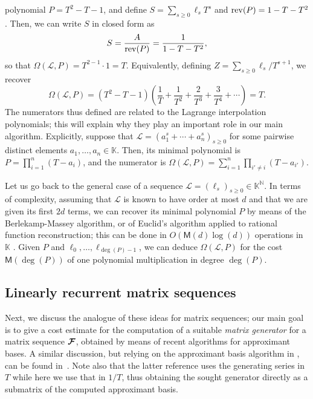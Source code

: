 \documentclass[12pt]{article}
\newcommand{\var}{T} %
\newcommand{\mat}[1]{\bm{\MakeUppercase{#1}}} %
\newcommand{\seq}{\mat{\mathcal{F}}} %
\newcommand{\genseries}{Z}
\newcommand{\minpoly}{P}
\def\M {\ensuremath{\mathsf{M}}}
\def\N {\ensuremath{\mathbb{N}}}
\def\K{\mathbb{K}}
\def\K {\ensuremath{\mathbb{K}}}
\begin{document}
polynomial $P=T^2-T-1$, and define $S= \sum_{s\ge 0} \ell_{s} T^s$ and
${\rm rev}(P) = 1-T-T^2$. Then, we can write $S$ in closed form as
$$S = \frac{A}{{\rm rev}(P)} = \frac{1}{1-T-T^2},$$
so that $\Omega(\mathcal{L},P)=T^{2-1} \cdot 1=T$. Equivalently, defining
$\genseries = \sum_{s\ge0} \ell_{s}/T^{s+1}$, we recover 
\[
  \Omega(\mathcal{L},P) = (T^2-T-1)\left (\frac 1T +\frac 1{T^2} + \frac
  2{T^3} + \frac 3{T^4} + \cdots \right ) =T.
\]
The numerators thus defined are related to the Lagrange interpolation
polynomials; this will explain why they play an important role in our main
algorithm. Explicitly, suppose that $\mathcal{L} = (a_1^s + \cdots + a_n^s)_{s
\ge 0}$ for some pairwise distinct elements $a_1,\dots,a_n \in \K$. Then, its
minimal polynomial is $\minpoly=\prod_{i=1}^n (T-a_i)$, and the numerator
is $\Omega(\mathcal{L}, P) = \sum_{i=1}^n \prod_{i'\ne i} (T-a_{i'})$.

Let us go back to the general case of a sequence $\mathcal{L}
=(\ell_s)_{s\ge0}\in\K^\N$.  In terms of complexity, assuming that
$\mathcal{L}$ is known to have order at most $d$ and that we are given its
first $2d$ terms, we can recover its minimal polynomial $P$ by means of the
Berlekamp-Massey algorithm, or of Euclid's algorithm applied to rational
function reconstruction; this can be done in $O(\M(d)\log(d))$ operations in
$\K$ \cite{BrGuYu80}. Given $P$ and $\ell_0,\dots,\ell_{\deg(P)-1}$, we can
deduce $\Omega(\mathcal{L},P)$ for the cost $\M(\deg(P))$ of one polynomial
multiplication in degree $\deg(P)$.



\subsection{Linearly recurrent matrix sequences}\label{section:matrix_seq}

Next, we discuss the analogue of these ideas for matrix sequences; our main
goal is to give a cost estimate for the computation of a suitable {\em matrix
generator} for a matrix sequence $\seq$, obtained by means of recent algorithms
for approximant bases. A similar discussion, but relying on the approximant
basis algorithm in \cite{BecLab94}, can be found in~\cite[Chapter~4]{Turner02}.
Note also that the latter reference uses the generating series in $\var$ while
here we use that in $1/\var$, thus obtaining the sought generator directly as a
submatrix of the computed approximant basis.
\end{document}
